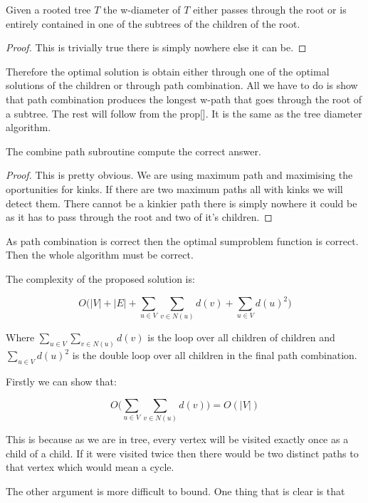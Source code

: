 \begin{prop} Given a rooted tree $T$ the w-diameter of $T$ either passes through the root or is entirely contained in one of the subtrees of the children of the root. \end{prop}

\begin{proof}
    This is trivially true there is simply nowhere else it can be.
\end{proof}

Therefore the optimal solution is obtain either through one of the optimal solutions of the children or through path combination. All we have to do is show that path combination produces the longest w-path that goes through the root of a subtree. The rest will follow from the prop[]. It is the same as the tree diameter algorithm.

\begin{prop} The combine path subroutine compute the correct answer. \end{prop}

\begin{proof}
    This is pretty obvious. We are using maximum path and maximising the oportunities for kinks. If there are two maximum paths all with kinks we will detect them. There cannot be a kinkier path there is simply nowhere it could be as it has to pass through the root and two of it's children.
\end{proof}

As path combination is correct then the optimal sumproblem function is correct. Then the whole algorithm must be correct.

The complexity of the proposed solution is:

$$ O\bigg( |V| + |E| + \sum_{u \in V}{\sum_{v \in N(u)}{d(v)}} + \sum_{u \in V}{d(u)^2}  \bigg) $$

Where $\sum_{u \in V}{\sum_{v \in N(u)}{d(v)}}$ is the loop over all children of children and $\sum_{u \in V}{d(u)^2}$ is the double loop over all children in the final path combination.

Firstly we can show that:

$$ O\bigg( \sum_{u \in V}{\sum_{v \in N(u)}{d(v)}} \bigg) = O(|V|) $$

This is because as we are in tree, every vertex will be visited exactly once as a child of a child. If it were visited twice then there would be two distinct paths to that vertex which would mean a cycle. 

The other argument is more difficult to bound. One thing that is clear is that 

